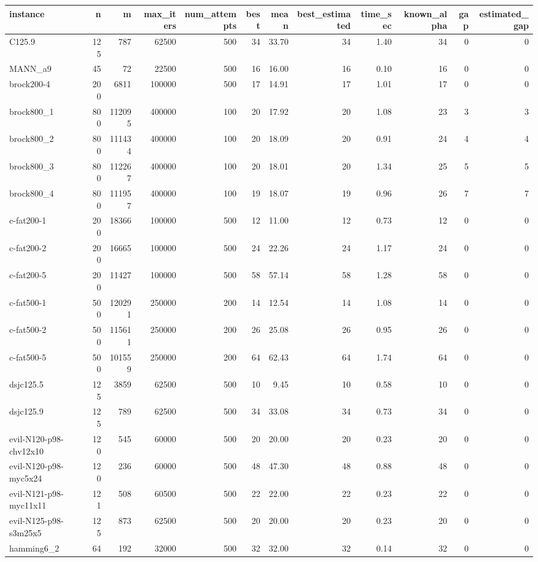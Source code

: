 \begin{tabular}{lrrrrrrrrrrr}
\toprule
instance & n & m & max\_iters & num\_attempts & best & mean & best\_estimated & time\_sec & known\_alpha & gap & estimated\_gap \\
\midrule
C125.9 & 125 & 787 & 62500 & 500 & 34 & 33.70 & 34 & 1.40 & 34 & 0 & 0 \\
MANN\_a9 & 45 & 72 & 22500 & 500 & 16 & 16.00 & 16 & 0.10 & 16 & 0 & 0 \\
brock200-4 & 200 & 6811 & 100000 & 500 & 17 & 14.91 & 17 & 1.01 & 17 & 0 & 0 \\
brock800\_1 & 800 & 112095 & 400000 & 100 & 20 & 17.92 & 20 & 1.08 & 23 & 3 & 3 \\
brock800\_2 & 800 & 111434 & 400000 & 100 & 20 & 18.09 & 20 & 0.91 & 24 & 4 & 4 \\
brock800\_3 & 800 & 112267 & 400000 & 100 & 20 & 18.01 & 20 & 1.34 & 25 & 5 & 5 \\
brock800\_4 & 800 & 111957 & 400000 & 100 & 19 & 18.07 & 19 & 0.96 & 26 & 7 & 7 \\
c-fat200-1 & 200 & 18366 & 100000 & 500 & 12 & 11.00 & 12 & 0.73 & 12 & 0 & 0 \\
c-fat200-2 & 200 & 16665 & 100000 & 500 & 24 & 22.26 & 24 & 1.17 & 24 & 0 & 0 \\
c-fat200-5 & 200 & 11427 & 100000 & 500 & 58 & 57.14 & 58 & 1.28 & 58 & 0 & 0 \\
c-fat500-1 & 500 & 120291 & 250000 & 200 & 14 & 12.54 & 14 & 1.08 & 14 & 0 & 0 \\
c-fat500-2 & 500 & 115611 & 250000 & 200 & 26 & 25.08 & 26 & 0.95 & 26 & 0 & 0 \\
c-fat500-5 & 500 & 101559 & 250000 & 200 & 64 & 62.43 & 64 & 1.74 & 64 & 0 & 0 \\
dsjc125.5 & 125 & 3859 & 62500 & 500 & 10 & 9.45 & 10 & 0.58 & 10 & 0 & 0 \\
dsjc125.9 & 125 & 789 & 62500 & 500 & 34 & 33.08 & 34 & 0.73 & 34 & 0 & 0 \\
evil-N120-p98-chv12x10 & 120 & 545 & 60000 & 500 & 20 & 20.00 & 20 & 0.23 & 20 & 0 & 0 \\
evil-N120-p98-myc5x24 & 120 & 236 & 60000 & 500 & 48 & 47.30 & 48 & 0.88 & 48 & 0 & 0 \\
evil-N121-p98-myc11x11 & 121 & 508 & 60500 & 500 & 22 & 22.00 & 22 & 0.23 & 22 & 0 & 0 \\
evil-N125-p98-s3m25x5 & 125 & 873 & 62500 & 500 & 20 & 20.00 & 20 & 0.23 & 20 & 0 & 0 \\
hamming6\_2 & 64 & 192 & 32000 & 500 & 32 & 32.00 & 32 & 0.14 & 32 & 0 & 0 \\

\end{tabular}
